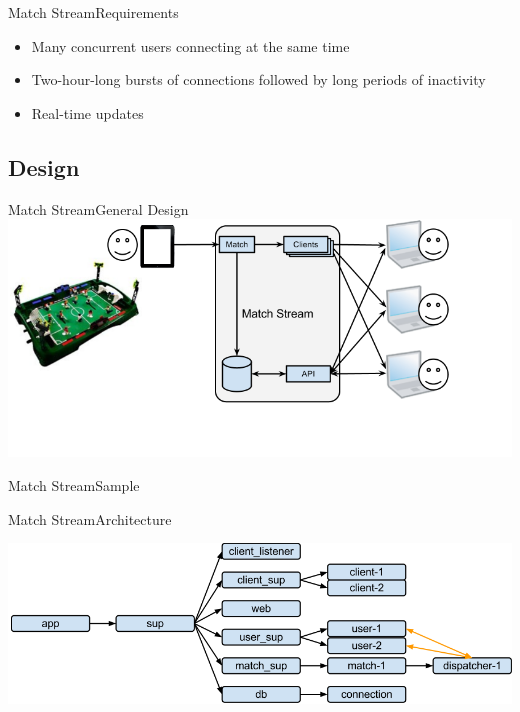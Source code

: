 \documentclass[utf8,hyperref={colorlinks=true}]{beamer}
\begin{document}
\begin{frame}{Match Stream}{Requirements}
	\begin{itemize}
		\item<+-> Many concurrent users connecting at the same time
		\item<+-> Two-hour-long bursts of connections followed by long periods of inactivity
		\item<+-> Real-time updates
	\end{itemize}
\end{frame}

\subsection{Design}
\begin{frame}{Match Stream}{General Design}
	\includegraphics[width=\textwidth]{img/MatchStream.png}
\end{frame}
\begin{frame}{Match Stream}{Sample}
	\tcpsample
\end{frame}
\begin{frame}[t]{Match Stream}{Architecture}
	\begin{center}
		\includegraphics[width=\textwidth]{img/architecture-1.png}
	\end{center}
\end{frame}
\end{document}
